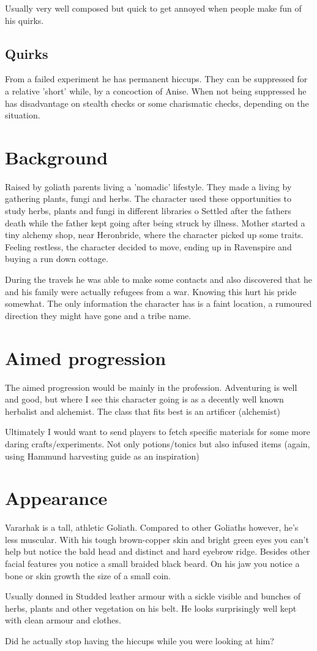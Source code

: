 Usually very well composed but quick to get annoyed when people make fun of his quirks.

\subsection{Quirks}
From a failed experiment he has permanent hiccups. They can be suppressed for a relative 'short' while, by a concoction of Anise. When not being suppressed he has disadvantage on stealth checks or some charismatic checks, depending on the situation.

\section{Background}
Raised by goliath parents living a 'nomadic' lifestyle. 
They made a living by gathering plants, fungi and herbs.
The character used these opportunities to study herbs, plants and fungi in different libraries o 
Settled after the fathers death while the father kept going after being struck by illness.
Mother started a tiny alchemy shop, near Heronbride, where the character picked up some traits.
Feeling restless, the character decided to move, ending up in Ravenspire and buying a run down cottage.

During the travels he was able to make some contacts and also discovered that he and his family were actually refugees from a war. Knowing this hurt his pride somewhat. The only information the character has is a faint location, a rumoured direction they might have gone and a tribe name.

\section{Aimed progression}
The aimed progression would be mainly in the profession. Adventuring is well and good, but where I see this character going is as a decently well known herbalist and alchemist. The class that fits best is an artificer (alchemist)

Ultimately I would want to send players to fetch specific materials for some more daring crafts/experiments. Not only potions/tonics but also infused items (again, using Hammund harvesting guide as an inspiration)

\section{Appearance}
Vararhak is a tall, athletic Goliath. Compared to other Goliaths however, he's less muscular. With his tough brown-copper skin and bright green eyes you can't help but notice the bald head and distinct and hard eyebrow ridge. Besides other facial features you notice a small braided black beard. On his jaw you notice a bone or skin growth the size of a small coin.

Usually donned in Studded leather armour with a sickle visible and bunches of herbs, plants and other vegetation on his belt. He looks surprisingly well kept with clean armour and clothes.


Did he actually stop having the hiccups while you were looking at him?